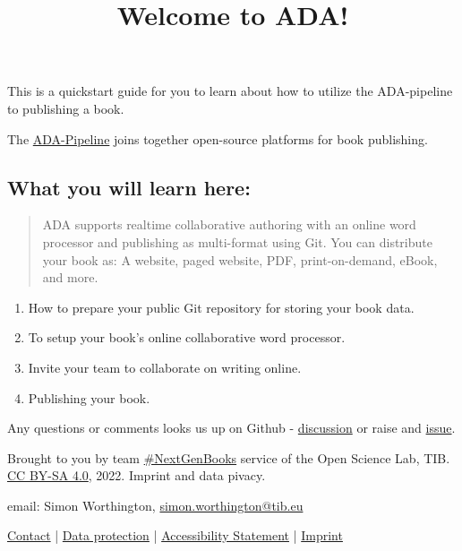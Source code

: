 \documentclass{article}
\begin{document}
\title{Welcome to ADA!}

\maketitle


This is a quickstart guide for you to learn about how to utilize the ADA-pipeline to publishing a book.


The \href{https://github.com/TIBHannover/ADA}{ADA-Pipeline} joins together open-source platforms for book publishing.


\subsection{What you will learn here:}\label{H7757657}


\begin{quote}



ADA supports realtime collaborative authoring with an online word processor and publishing as multi-format using Git. You can distribute your book as: A website, paged website, PDF, print-on-demand, eBook, and more.


\end{quote}

\begin{enumerate}
\item How to prepare your public Git repository for storing your book data.


\item To setup your book's online collaborative word processor.


\item Invite your team to collaborate on writing online.


\item Publishing your book. 


\end{enumerate}

Any questions or comments looks us up on Github - \href{https://github.com/TIBHannover/ADA/discussions}{discussion} or raise and \href{https://github.com/orgs/TIBHannover/projects/2}{issue}.


Brought to you by team \href{https://projects.tib.eu/nextgen-books/en/}{\#NextGenBooks} service of the Open Science Lab, TIB. \href{https://creativecommons.org/licenses/by-sa/4.0/}{CC BY-SA 4.0}, 2022. Imprint and data pivacy.


email: Simon Worthington, \href{mailto:simon.worthington@tib.eu}{simon.worthington@tib.eu}


\href{https://projects.tib.eu/nextgen-books/en/contact/}{Contact} | \href{https://projects.tib.eu/nextgen-books/en/data-protection/}{Data protection} | \href{https://projects.tib.eu/nextgen-books/en/accessibility-statement/}{Accessibility Statement} | \href{https://projects.tib.eu/nextgen-books/en/imprint/}{Imprint}
\end{document}
